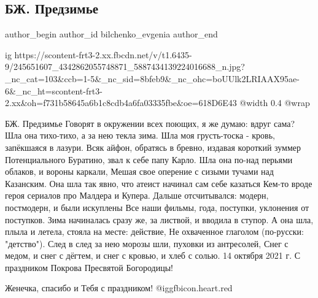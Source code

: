 
 
 
 
 
 
\subsection{БЖ. Предзимье}
\label{sec:14_10_2021.fb.bilchenko_evgenia.2.predzimje}
 
\ifcmt
 author_begin
   author_id bilchenko_evgenia
 author_end
\fi

\ifcmt
  ig https://scontent-frt3-2.xx.fbcdn.net/v/t1.6435-9/245651607_4342862055748871_5887434139224016688_n.jpg?_nc_cat=103&ccb=1-5&_nc_sid=8bfeb9&_nc_ohc=boUUlk2LRIAAX95ae-6&_nc_ht=scontent-frt3-2.xx&oh=f731b58645a6b1c8cdb4a6fa03335fbe&oe=618D6E43
  @width 0.4
  @wrap 
\fi

БЖ. Предзимье
Говорят в окружении всех поющих, я же думаю: вдруг сама?
Шла она тихо-тихо, а за нею текла зима.
Шла моя грусть-тоска - кровь, запёкшаяся в лазури.
Всяк айфон, обратясь в бревно, издавая короткий зуммер
Потенциального Буратино, звал к себе папу  Карло.
Шла она по-над перьями облаков, и вороны каркали,
Мешая свое оперение с сизыми тучами над Казанским.
Она шла так явно, что атеист начинал сам себе казаться
Кем-то вроде героя сериалов про Малдера и Купера.
Дальше отсчитывался: модерн, постмодерн, и были искуплены
Все наши фильмы, года, поступки, уклонения от поступков.
Зима начиналась сразу же, за листвой, и вводила в ступор.
А она шла, плыла и летела, стояла на месте: действие,
Не охваченное глаголом (по-русски: "детство").
След в след за нею морозы шли, пуховки из антресолей,
Снег с медом, и снег с дёгтем, и снег с кровью, и хлеб с солью.
14 октября 2021 г.
С праздником Покрова Пресвятой Богородицы!

\begin{itemize} %
Женечка, спасибо и Тебя с праздником!  @igg{fbicon.heart.red}
\end{itemize} %
